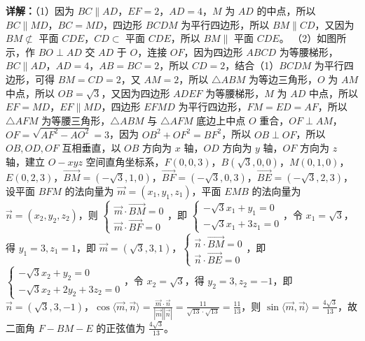 \begin{question}[points=12]
\begin{solution}
\textbf{详解：}（1）因为 $BC\parallel AD$，$EF=2$，$AD=4$，$M$ 为 $AD$ 的中点，所以 $BC\parallel MD$，$BC=MD$，四边形 $BCDM$ 为平行四边形，所以 $BM\parallel CD$，又因为 $BM\not\subset$ 平面 $CDE$，$CD\subset$ 平面 $CDE$，所以 $BM\parallel$ 平面 $CDE$。
（2）如图所示，作 $BO\perp AD$ 交 $AD$ 于 $O$，连接 $OF$，因为四边形 $ABCD$ 为等腰梯形，$BC\parallel AD$，$AD=4$，$AB=BC=2$，所以 $CD=2$，结合（1）$BCDM$ 为平行四边形，可得 $BM=CD=2$，又 $AM=2$，所以 $\triangle ABM$ 为等边三角形，$O$ 为 $AM$ 中点，所以 $OB=\sqrt{3}$，又因为四边形 $ADEF$ 为等腰梯形，$M$ 为 $AD$ 中点，所以 $EF=MD$，$EF\parallel MD$，四边形 $EFMD$ 为平行四边形，$FM=ED=AF$，所以 $\triangle AFM$ 为等腰三角形，$\triangle ABM$ 与 $\triangle AFM$ 底边上中点 $O$ 重合，$OF\perp AM$，$OF=\sqrt{AF^2-AO^2}=3$，因为 $OB^2+OF^2=BF^2$，所以 $OB\perp OF$，所以 $OB,OD,OF$ 互相垂直，以 $OB$ 方向为 $x$ 轴，$OD$ 方向为 $y$ 轴，$OF$ 方向为 $z$ 轴，建立 $O-xyz$ 空间直角坐标系，$F(0,0,3)$，$B(\sqrt{3},0,0)$，$M(0,1,0)$，$E(0,2,3)$，$\overrightarrow{BM}=(-\sqrt{3},1,0)$，$\overrightarrow{BF}=(-\sqrt{3},0,3)$，$\overrightarrow{BE}=(-\sqrt{3},2,3)$，设平面 $BFM$ 的法向量为 $\vec{m}=(x_1,y_1,z_1)$，平面 $EMB$ 的法向量为 $\vec{n}=(x_2,y_2,z_2)$，则 $\begin{cases} \vec{m}\cdot\overrightarrow{BM}=0 \\ \vec{m}\cdot\overrightarrow{BF}=0 \end{cases}$，即 $\begin{cases} -\sqrt{3}x_1+y_1=0 \\ -\sqrt{3}x_1+3z_1=0 \end{cases}$，令 $x_1=\sqrt{3}$，得 $y_1=3,z_1=1$，即 $\vec{m}=(\sqrt{3},3,1)$，$\begin{cases} \vec{n}\cdot\overrightarrow{BM}=0 \\ \vec{n}\cdot\overrightarrow{BE}=0 \end{cases}$，即 $\begin{cases} -\sqrt{3}x_2+y_2=0 \\ -\sqrt{3}x_2+2y_2+3z_2=0 \end{cases}$，令 $x_2=\sqrt{3}$，得 $y_2=3,z_2=-1$，即 $\vec{n}=(\sqrt{3},3,-1)$，$\cos\langle\vec{m},\vec{n}\rangle=\frac{\vec{m}\cdot\vec{n}}{|\vec{m}||\vec{n}|}=\frac{11}{\sqrt{13}\cdot\sqrt{13}}=\frac{11}{13}$，则 $\sin\langle\vec{m},\vec{n}\rangle=\frac{4\sqrt{3}}{13}$，故二面角 $F-BM-E$ 的正弦值为 $\frac{4\sqrt{3}}{13}$。
\end{solution}
\end{question}

